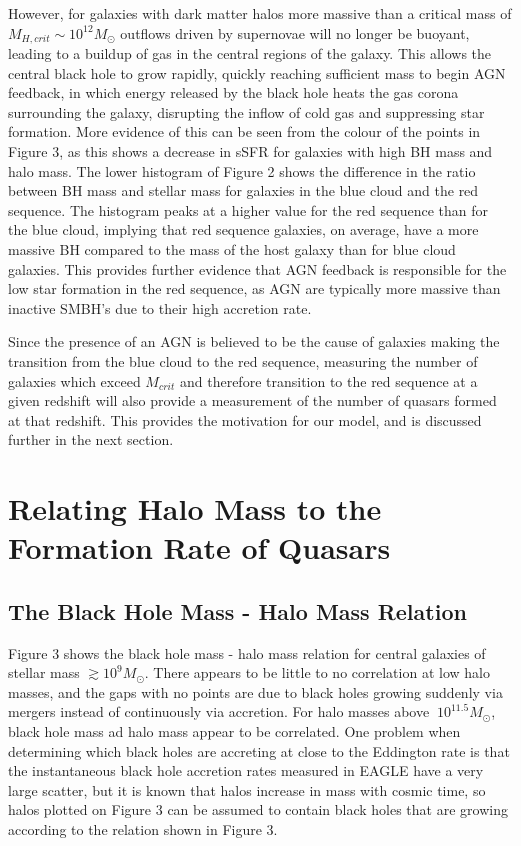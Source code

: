 \documentclass[12pt, twocolumn]{report}%
\begin{document}
\noindent However, for galaxies with dark matter halos more massive than a critical mass of $M_{H,crit}\sim10^{12}M_\odot$ outflows driven by supernovae will no longer be buoyant, leading to a buildup of gas in the central regions of the galaxy. This allows the central black hole to grow rapidly, quickly reaching sufficient mass to begin AGN feedback, in which energy released by the black hole heats the gas corona surrounding the galaxy, disrupting the inflow of cold gas and suppressing star formation. More evidence of this can be seen from the colour of the points in Figure 3, as this shows a decrease in sSFR for galaxies with high BH mass and halo mass. The lower histogram of Figure 2 shows the difference in the ratio between BH mass and stellar mass for galaxies in the blue cloud and the red sequence. The histogram peaks at a higher value for the red sequence than for the blue cloud, implying that red sequence galaxies, on average, have a more massive BH compared to the mass of the host galaxy than for blue cloud galaxies. This provides further evidence that AGN feedback is responsible for the low star formation in the red sequence, as AGN are typically more massive than inactive SMBH's due to their high accretion rate.\par

\vspace*{1cm}

Since the presence of an AGN is believed to be the cause of galaxies making the transition from the blue cloud to the red sequence, measuring the number of galaxies which exceed $M_{crit}$ and therefore transition to the red sequence at a given redshift will also provide a measurement of the number of quasars formed at that redshift. This provides the motivation for our model, and is discussed further in the next section.

\vspace*{2cm}

\section{Relating Halo Mass to the Formation Rate of Quasars}
\subsection{The Black Hole Mass - Halo Mass Relation}

Figure 3 shows the black hole mass - halo mass relation for central galaxies of stellar mass $\gtrsim10^9M_\odot$. There appears to be little to no correlation at low halo masses, and the gaps with no points are due to black holes growing suddenly via mergers instead of continuously via accretion. For halo masses above $~10^{11.5}M_\odot$, black hole mass ad halo mass appear to be correlated. One problem when determining which black holes are accreting at close to the Eddington rate is that the instantaneous black hole accretion rates measured in EAGLE have a very large scatter, but it is known that halos increase in mass with cosmic time, so halos plotted on Figure 3 can be assumed to contain black holes that are growing according to the relation shown in Figure 3.\par
\end{document}
